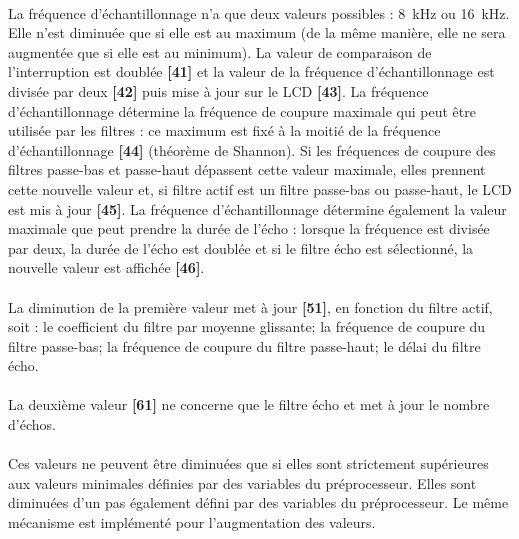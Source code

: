 \documentclass{article}
\begin{document}
    \paragraph{}
    La fréquence d'échantillonnage n'a que deux valeurs possibles : \SI{8}{\kilo\hertz} ou \SI{16}{\kilo\hertz}. Elle n'est diminuée que si elle est au maximum (de la même manière, elle ne sera augmentée que si elle est au minimum). La valeur de comparaison de l'interruption est doublée \textbf{[41]} et la valeur de la fréquence d'échantillonnage est divisée par deux \textbf{[42]} puis mise à jour sur le LCD \textbf{[43]}. La fréquence d'échantillonnage détermine la fréquence de coupure maximale qui peut être utilisée par les filtres : ce maximum est fixé à la moitié de la fréquence d'échantillonnage \textbf{[44]} (théorème de Shannon). Si les fréquences de coupure des filtres passe-bas et passe-haut dépassent cette valeur maximale, elles prennent cette nouvelle valeur et, si filtre actif est un filtre passe-bas ou passe-haut, le LCD est mis à jour \textbf{[45]}. La fréquence d'échantillonnage détermine également la valeur maximale que peut prendre la durée de l'écho : lorsque la fréquence est divisée par deux, la durée de l'écho est doublée et si le filtre écho est sélectionné, la nouvelle valeur est affichée \textbf{[46]}.

    \paragraph{}
    La diminution de la première valeur met à jour \textbf{[51]}, en fonction du filtre actif, soit : le coefficient du filtre par moyenne glissante; la fréquence de coupure du filtre passe-bas; la fréquence de coupure du filtre passe-haut; le délai du filtre écho.

    \paragraph{}
    La deuxième valeur \textbf{[61]} ne concerne que le filtre écho et met à jour le nombre d'échos.

    \paragraph{}
    Ces valeurs ne peuvent être diminuées que si elles sont strictement supérieures aux valeurs minimales définies par des variables du préprocesseur. Elles sont diminuées d'un pas également défini par des variables du préprocesseur. Le même mécanisme est implémenté pour l'augmentation des valeurs.
\end{document}
